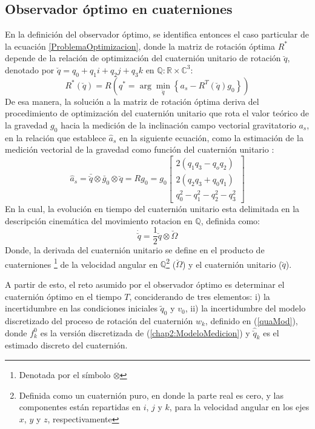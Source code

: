 \documentclass[conference]{IEEEtran}
\begin{document}
\subsection{Observador óptimo en cuaterniones}
En la definición del observador óptimo, se identifica entonces el caso particular de la ecuación \ref{ProblemaOptimizacion}, donde la matriz de rotación óptima $R^*$ depende de la relación de optimización del cuaternión unitario de rotación $\breve{q}$, denotado por $\breve{q}=q_0+q_1i+q_2j+q_3k$ en $\mathbb{Q}:\mathbb{R}\times\mathbb{C}^3$:
\begin{equation}\label{ProblemaOptimizacionAcc}
R^*(\breve{q})=R\left(q^*=\arg\min_{\breve{q}}\left\{a_s-R^T(\breve{q})g_0\right\}\right)
\end{equation} 
De esa manera, la solución a la matriz de rotación óptima deriva del procedimiento  de optimización del cuaternión unitario que rota el valor teórico de la gravedad $g_0$ hacia la medición de la inclinación campo vectorial gravitatorio $a_s$, en la relación que establece $\hat{a}_s$ en la siguiente ecuación, como la estimación de la medición vectorial de la gravedad como función del cuaternión unitario \cite{Sola2012}:
\begin{equation}\label{chap2:ModeloMedicion}
\hat{a}_s=\bar{\breve{q}}\otimes\breve{g_0}\otimes\breve{q}=Rg_0=g_0\begin{bmatrix}2(q_1q_3-q_oq_2)\\2(q_2q_3+q_0q_1)\\q_0^2-q_1^2-q_2^2-q_3^2\end{bmatrix}
\end{equation}
En la cual, la evolución en tiempo del cuaternión unitario esta delimitada en la descripción cinemática del movimiento rotacion en $\mathbb{Q}$, definida como:
\begin{equation}
\dot{\breve{q}}=\frac{1}{2}\breve{q}\otimes\breve{\Omega}
\end{equation}
Donde, la derivada del cuaternión unitario se define en el producto de cuaterniones \footnote{Denotada por el símbolo $\otimes$} de la velocidad angular en $\mathbb{Q}$\footnote{Definida como un cuaternión puro, en donde la parte real es cero, y las componentes están repartidas en $i$, $j$ y $k$, para la velocidad angular en los ejes $x$, $y$ y $z$, respectivamente} ($\breve{\Omega}$) y el cuaternión unitario ($\breve{q}$).\par
A partir de esto, el reto asumido por el observador óptimo es determinar el cuaternión óptimo en el tiempo $T$, conciderando de tres elementos: i) la incertidumbre en las condiciones iniciales $\tilde{q}_0$ y $v_0$, ii) la incertidumbre del modelo discretizado del proceso de rotación del cuaternión $w_k$, definido en (\ref{quaMod}), donde $f^0_k$ es la versión discretizada de (\ref{chap2:ModeloMedicion}) y $\hat{\breve{q}}_{k}$ es el estimado discreto del cuaternión.
\end{document}
